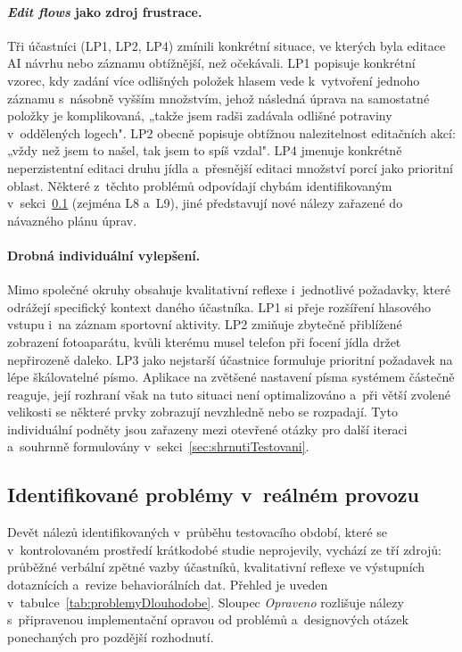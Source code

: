 \paragraph{\emph{Edit flows} jako zdroj frustrace.}
Tři účastníci (LP1, LP2, LP4) zmínili konkrétní situace, ve kterých byla editace AI návrhu nebo záznamu obtížnější, než očekávali.
LP1 popisuje konkrétní vzorec, kdy zadání více odlišných položek hlasem vede k~vytvoření jednoho záznamu s~násobně vyšším množstvím, jehož následná úprava na samostatné položky je komplikovaná, „takže jsem radši zadávala odlišné potraviny v~oddělených logech".
LP2 obecně popisuje obtížnou nalezitelnost editačních akcí: „vždy než jsem to našel, tak jsem to spíš vzdal".
LP4 jmenuje konkrétně neperzistentní editaci druhu jídla a~přesnější editaci množství porcí jako prioritní oblast.
Některé z~těchto problémů odpovídají chybám identifikovaným v~sekci~\ref{subsec:problemyDlouhodobe} (zejména L8 a~L9), jiné představují nové nálezy zařazené do návazného plánu úprav.

\paragraph{Drobná individuální vylepšení.}
Mimo společné okruhy obsahuje kvalitativní reflexe i~jednotlivé požadavky, které odrážejí specifický kontext daného účastníka.
LP1 si přeje rozšíření hlasového vstupu i~na záznam sportovní aktivity.
LP2 zmiňuje zbytečně přiblížené zobrazení fotoaparátu, kvůli kterému musel telefon při focení jídla držet nepřirozeně daleko.
LP3 jako nejstarší účastnice formuluje prioritní požadavek na lépe škálovatelné písmo. Aplikace na zvětšené nastavení písma systémem částečně reaguje, její rozhraní však na tuto situaci není optimalizováno a~při větší zvolené velikosti se některé prvky zobrazují nevzhledně nebo se rozpadají.
Tyto individuální podněty jsou zařazeny mezi otevřené otázky pro další iteraci a~souhrnně formulovány v~sekci~\ref{sec:shrnutiTestovani}.

\subsection{Identifikované problémy v~reálném provozu}
\label{subsec:problemyDlouhodobe}

Devět nálezů identifikovaných v~průběhu testovacího období, které se v~kontrolovaném prostředí krátkodobé studie neprojevily, vychází ze tří zdrojů: průběžné verbální zpětné vazby účastníků, kvalitativní reflexe ve výstupních dotaznících a~revize behaviorálních dat.
Přehled je uveden v~tabulce~\ref{tab:problemyDlouhodobe}.
Sloupec \emph{Opraveno} rozlišuje nálezy s~připravenou implementační opravou od problémů a~designových otázek ponechaných pro pozdější rozhodnutí.

